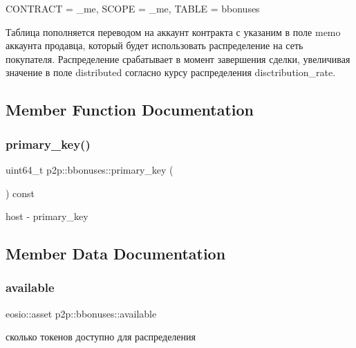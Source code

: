C\+O\+N\+T\+R\+A\+CT = \+\_\+me, S\+C\+O\+PE = \+\_\+me, T\+A\+B\+LE = bbonuses

Таблица пополняется переводом на аккаунт контракта с указаним в поле memo аккаунта продавца, который будет использовать распределение на сеть покупателя. Распределение срабатывает в момент завершения сделки, увеличивая значение в поле distributed согласно курсу распределения disctribution\+\_\+rate. 

\subsection{Member Function Documentation}
\mbox{\label{structp2p_1_1bbonuses_a1707459d7b5c7a86f93973cd2af50736}} 
\subsubsection{\texorpdfstring{primary\+\_\+key()}{primary\_key()}}
{\footnotesize\ttfamily uint64\+\_\+t p2p\+::bbonuses\+::primary\+\_\+key (\begin{DoxyParamCaption}{ }\end{DoxyParamCaption}) const\hspace{0.3cm}{\ttfamily [inline]}}

host -\/ primary\+\_\+key 

\subsection{Member Data Documentation}
\mbox{\label{structp2p_1_1bbonuses_a931f287a96041d2c581c4c733a62185e}} 
\subsubsection{\texorpdfstring{available}{available}}
{\footnotesize\ttfamily eosio\+::asset p2p\+::bbonuses\+::available}

сколько токенов доступно для распределения \mbox{\label{structp2p_1_1bbonuses_af7676fed529979ab6365421cd6cf72ef}} 
